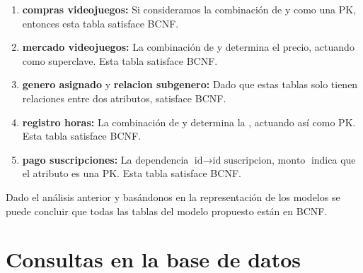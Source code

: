 \documentclass[12pt]{article}
\begin{document}
\begin{enumerate}
    \item \textbf{compras videojuegos:} Si consideramos la combinación de  y  como una PK, entonces esta tabla satisface BCNF.
    
    \item \textbf{mercado videojuegos:} La combinación de  y  determina el precio, actuando como superclave. Esta tabla satisface BCNF.
    
    \item \textbf{genero asignado} y \textbf{relacion subgenero:} Dado que estas tablas solo tienen relaciones entre dos atributos, satisface BCNF.
    
    \item \textbf{registro horas:} La combinación de  y  determina la , actuando así como PK. Esta tabla satisface BCNF.
    
    \item \textbf{pago suscripciones:} La dependencia \( \text{id} \rightarrow \text{id suscripcion, monto} \) indica que el atributo  es una PK. Esta tabla satisface BCNF.
\end{enumerate}

Dado el análisis anterior y basándonos en la representación de los modelos se puede concluir que todas las tablas del modelo propuesto están en BCNF.

\newpage

\section{Consultas en la base de datos}
\end{document}
